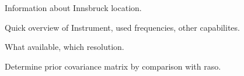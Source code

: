 Information about Innsbruck location.

\startsection[title=HATPRO]

    Quick overview of Instrument, used frequencies, other capabilites.

\stopsection

\startsection[title=Radiosonde Climatology]

    What available, which resolution.

\stopsection

\startsection[title=COSMO? Simulated Radiosoundings]

    Determine prior covariance matrix by comparison with raso.

\stopsection
